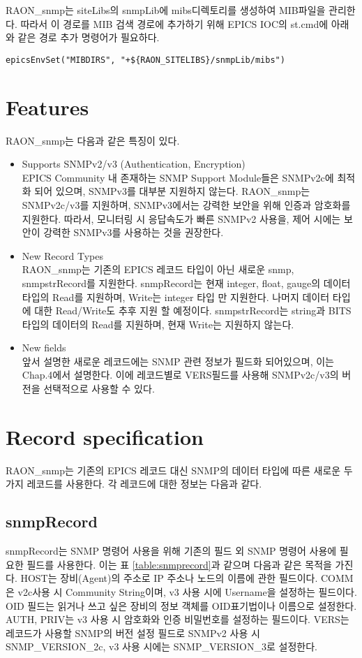\documentclass[11pt
  , a4paper
  , article
  , oneside
]{memoir}
\begin{document}
RAON\_snmp는 siteLibs의 snmpLib에 mibs디렉토리를 생성하여 MIB파일을 관리한다. 따라서 이 경로를 MIB 검색 경로에 추가하기 위해 EPICS IOC의 st.cmd에 아래와 같은 경로 추가 명령어가 필요하다.  
{\scriptsize
\begin{verbatim}
epicsEnvSet("MIBDIRS", "+${RAON_SITELIBS}/snmpLib/mibs")
\end{verbatim}
}

\chapter{Features}
RAON\_snmp는 다음과 같은 특징이 있다. 

\begin{itemize}
\item Supports SNMPv2/v3 (Authentication, Encryption) \\
EPICS Community 내 존재하는 SNMP Support Module들은 SNMPv2c에 최적화 되어 있으며, SNMPv3를 대부분 지원하지 않는다. RAON\_snmp는 SNMPv2c/v3를 지원하며, SNMPv3에서는 강력한 보안을 위해 인증과 암호화를 지원한다. 따라서, 모니터링 시 응답속도가 빠른 SNMPv2 사용을, 제어 시에는 보안이 강력한 SNMPv3를 사용하는 것을 권장한다.

\item New Record Types \\
RAON\_snmp는 기존의 EPICS 레코드 타입이 아닌 새로운 snmp, snmpstrRecord를 지원한다. snmpRecord는 현재 integer, float, gauge의 데이터 타입의 Read를 지원하며, Write는 integer 타입 만 지원한다. 나머지 데이터 타입에 대한 Read/Write도 추후 지원 할 예정이다. snmpstrRecord는 string과 BITS타입의 데이터의 Read를 지원하며, 현재 Write는 지원하지 않는다.

\item New fields \\
앞서 설명한 새로운 레코드에는 SNMP 관련 정보가 필드화 되어있으며, 이는 Chap.4에서 설명한다. 이에 레코드별로 VERS필드를 사용해 SNMPv2c/v3의 버전을 선택적으로 사용할 수 있다. 
\end{itemize}

\chapter{Record specification}
RAON\_snmp는 기존의 EPICS 레코드 대신 SNMP의 데이터 타입에 따른 새로운 두 가지 레코드를 사용한다.
각 레코드에 대한 정보는 다음과 같다.

\section{snmpRecord}
snmpRecord는 SNMP 명령어 사용을 위해 기존의 필드 외 SNMP 명령어 사용에 필요한 필드를 사용한다. 이는 표 \ref{table:snmprecord}과 같으며 다음과 같은 목적을 가진다. HOST는 장비(Agent)의 주소로 IP 주소나 노드의 이름에 관한 필드이다. COMM은 v2c사용 시 Community String이며, v3 사용 시에 Username을 설정하는 필드이다. OID 필드는 읽거나 쓰고 싶은 장비의 정보 객체를 OID표기법이나 이름으로 설정한다. AUTH, PRIV는 v3 사용 시 암호화와 인증 비밀번호를 설정하는 필드이다. VERS는 레코드가 사용할 SNMP의 버전 설정 필드로 SNMPv2 사용 시 SNMP\_VERSION\_2c, v3 사용 시에는 SNMP\_VERSION\_3로 설정한다. 
\clearpage
\end{document}
